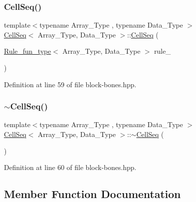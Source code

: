 \subsubsection{\texorpdfstring{Cell\+Seq()}{CellSeq()}\hspace{0.1cm}{\footnotesize\ttfamily [2/2]}}
{\footnotesize\ttfamily template$<$typename Array\+\_\+\+Type , typename Data\+\_\+\+Type $>$ \\
\hyperlink{class_cell_seq}{Cell\+Seq}$<$ Array\+\_\+\+Type, Data\+\_\+\+Type $>$\+::\hyperlink{class_cell_seq}{Cell\+Seq} (\begin{DoxyParamCaption}\item[{\hyperlink{typedefs_8hpp_a2e147c9c0e8b65be614c98a5dd400d5c}{Rule\+\_\+fun\+\_\+type}$<$ Array\+\_\+\+Type, Data\+\_\+\+Type $>$}]{rule\+\_\+ }\end{DoxyParamCaption})\hspace{0.3cm}{\ttfamily [inline]}}



Definition at line 59 of file block-\/bones.\+hpp.

\mbox{\label{class_cell_seq_aa52be587e92f0d246bd84980c3e8b540}} 
\subsubsection{\texorpdfstring{$\sim$\+Cell\+Seq()}{~CellSeq()}}
{\footnotesize\ttfamily template$<$typename Array\+\_\+\+Type , typename Data\+\_\+\+Type $>$ \\
\hyperlink{class_cell_seq}{Cell\+Seq}$<$ Array\+\_\+\+Type, Data\+\_\+\+Type $>$\+::$\sim$\hyperlink{class_cell_seq}{Cell\+Seq} (\begin{DoxyParamCaption}{ }\end{DoxyParamCaption})\hspace{0.3cm}{\ttfamily [inline]}}



Definition at line 60 of file block-\/bones.\+hpp.



\subsection{Member Function Documentation}
\mbox{\label{class_cell_seq_a844b28a2053fd2c6810340a5a9aef945}} 
